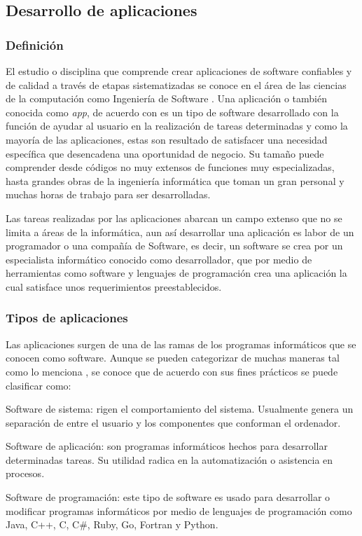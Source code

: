 \subsection{Desarrollo de aplicaciones}
\subsubsection{Definición}
El estudio o disciplina que comprende crear aplicaciones de software confiables y de calidad a través de etapas sistematizadas se conoce en el área de las ciencias de la computación como Ingeniería de Software \parencite{Sommerville2005}. Una aplicación o también conocida como \textit{app}, de acuerdo con \textcite{Pressman2002} es un tipo de software desarrollado con la función de ayudar al usuario en la realización de tareas determinadas y como la mayoría de las aplicaciones, estas son resultado de satisfacer una necesidad específica que desencadena una oportunidad de negocio. Su tamaño puede comprender desde códigos no muy extensos de funciones muy especializadas, hasta grandes obras de la ingeniería informática que toman un gran personal y muchas horas de trabajo para ser desarrolladas.

Las tareas realizadas por las aplicaciones abarcan un campo extenso que no se limita a áreas de la informática, aun así desarrollar una aplicación es labor de un programador o una compañía de Software, es decir, un software se crea por un especialista informático conocido como desarrollador, que por medio de herramientas como software y lenguajes de programación crea una aplicación la cual satisface unos requerimientos preestablecidos. 

\subsubsection{Tipos de aplicaciones}
Las aplicaciones surgen de una de las ramas de los programas informáticos que se conocen como software. Aunque se pueden categorizar de muchas maneras tal como lo menciona \parencite{Pressman2002}, se conoce que de acuerdo con sus fines prácticos se puede clasificar como:

\begin{APAitemize}
    \item Software de sistema: rigen el comportamiento del sistema. Usualmente genera un separación de entre el usuario y los componentes que conforman el ordenador. 
    \item Software de aplicación: son programas informáticos hechos para desarrollar determinadas tareas. Su utilidad radica en la automatización o asistencia en procesos.
    \item Software de programación: este tipo de software es usado para desarrollar o modificar programas informáticos por medio de lenguajes de programación como Java, C++, C, C\#, Ruby, Go, Fortran y Python.
\end{APAitemize}

